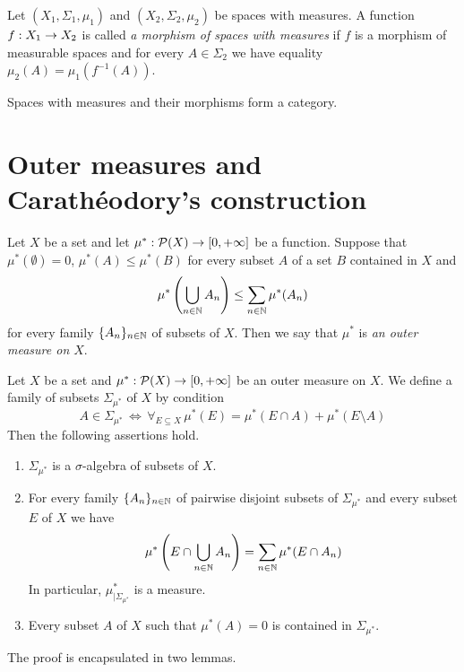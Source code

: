 \begin{definition}
Let $(X_1,\Sigma_1,\mu_1)$ and $(X_2,\Sigma_2,\mu_2)$ be spaces with measures. A function $f:X_1\rightarrow X_2$ is called \textit{a morphism of spaces with measures} if $f$ is a morphism of measurable spaces and for every $A\in \Sigma_2$ we have equality $\mu_2(A)=\mu_1(f^{-1}(A))$.
\end{definition}
\noindent
Spaces with measures and their morphisms form a category.

\section{Outer measures and Carath{\'e}odory's construction}

\begin{definition}
Let $X$ be a set and let $\mu^*:{\mathcal P}(X)\rightarrow [0,+\infty]$ be a function. Suppose that $\mu^*(\emptyset) = 0$, $\mu^*(A) \leq \mu^*(B)$ for every subset $A$ of a set $B$ contained in $X$ and 
$$\mu^*\left( \bigcup_{n\in {\mathbb N}}A_n \right)\leq \sum_{n\in {\mathbb N}}\mu^*(A_n)$$ 
for every family  $\{A_n\}_{n\in {\mathbb N}}$ of subsets of $X$. Then we say that $\mu^*$ is \textit{an outer measure on $X$}.
\end{definition}

\begin{theorem}\label{theorem:caratheodory_construction}
Let $X$ be a set and $\mu^*:{\mathcal P}(X)\rightarrow [0,+\infty]$ be an outer measure on $X$. We define a family of subsets $\Sigma_{\mu^*}$ of $X$ by condition
$$A\in \Sigma_{\mu^*}\,\Leftrightarrow\,\forall_{E\subseteq X}\,\mu^*(E)=\mu^*(E\cap A)+\mu^*(E\setminus A)$$
Then the following assertions hold.
\begin{enumerate}[label=\emph{\textbf{(\arabic*)}}, leftmargin=*]
\item $\Sigma_{\mu^*}$ is a $\sigma$-algebra of subsets of $X$.
\item For every family $\{A_n\}_{n\in {\mathbb N}}$ of pairwise disjoint subsets of $\Sigma_{\mu^*}$ and every subset $E$ of $X$ we have
$$\mu^*\left(E\cap \bigcup_{n\in {\mathbb N}}A_n\right)=\sum_{n\in {\mathbb N}}\mu^*(E\cap A_n)$$
In particular, $\mu^*_{\mid \Sigma_{\mu^*}}$ is a measure.
\item Every subset $A$ of $X$ such that $\mu^*(A)=0$ is contained in $\Sigma_{\mu^*}$.
\end{enumerate}
\end{theorem}
\noindent
The proof is encapsulated in two lemmas.

